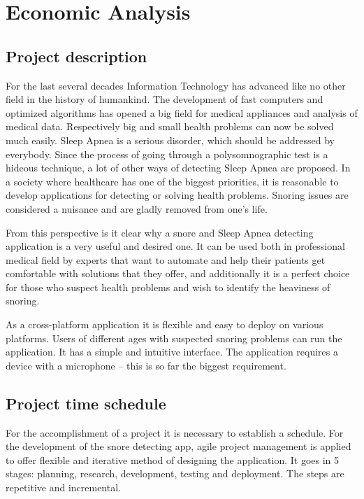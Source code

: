 \section{Economic Analysis}\label{sec:economy}

\subsection{Project description}
For the last several decades Information Technology has advanced like no other field in the history of humankind. The development of fast computers and optimized algorithms has opened a big field for medical appliances and analysis of medical data. Respectively big and small health problems can now be solved much easily. Sleep Apnea is a serious disorder, which should be addressed by everybody. Since the process of going through a polysomnographic test is a hideous technique, a lot of other ways of detecting Sleep Apnea are proposed. In a society where healthcare has one of the biggest priorities, it is reasonable to develop applications for detecting or solving health problems. Snoring issues are considered a nuisance and are gladly removed from one's life.

From this perspective is it clear why a snore and Sleep Apnea detecting application is a very useful and desired one. It can be used both in professional medical field by experts that want to automate and help their patients get comfortable with solutions that they offer, and additionally it is a perfect choice for those who suspect health problems and wish to identify the heaviness of snoring. 

As a cross-platform application it is flexible and easy to deploy on various platforms. Users of different ages with suspected snoring problems can run the application. It has a simple and intuitive interface. The application requires a device with a microphone -- this is so far the biggest requirement.

\subsection{Project time schedule}
For the accomplishment of a project it is necessary to establish a schedule. For the development of the snore detecting app, agile project management is applied to offer flexible and iterative method of designing the application. It goes in 5 stages: planning, research, development, testing and deployment. The steps are repetitive and incremental.

